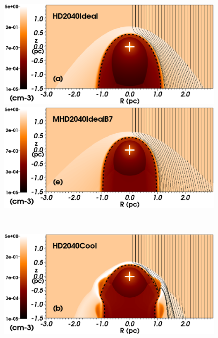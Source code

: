 \documentclass[useAMS,usenatbib]{mn2e}
\begin{document}
\begin{figure}
	\begin{minipage}[b]{ 0.48\textwidth}
		\includegraphics[width=1.0\textwidth]{./streamlines_map_20_Mo_40kms_MS_hdadia_legend.eps}
	\end{minipage}
	\begin{minipage}[b]{ 0.48\textwidth}
		\includegraphics[width=1.0\textwidth]{./streamlines_map_20_Mo_40kms_MS_mhdideal_legend.eps}
	\end{minipage} \\
	\begin{minipage}[b]{ 0.48\textwidth}
		\includegraphics[width=1.0\textwidth]{./streamlines_map_20_Mo_40kms_MS_hdcool_legend.eps}
	\end{minipage}

\end{figure}
\end{document}

